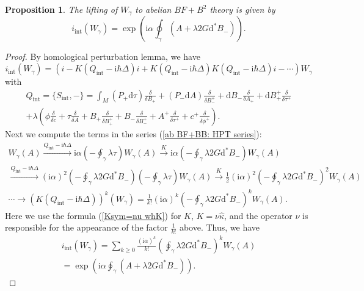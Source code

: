 \documentclass{amsart}
\theoremstyle{plain} %
\newtheorem{prop}[thm]{Proposition}
\theoremstyle{definition}
\theoremstyle{remark}
\newcommand{\ra}{\rightarrow}
\newcommand{\wh}{\widehat}
\newcommand{\xra}{\xrightarrow}
\newcommand{\ii}{\mathrm{int}}
\newcommand{\iii}{\mathrm{i}}
\newcommand{\dr}{\mathrm{d}}
\begin{document}
\begin{prop}\label{prop: lifting ab Wilson loop}
    The lifting of $W_\gamma$ to abelian $BF+B^2$ theory is given by
    \begin{equation}\label{ab BF+BB: i_int(W)}
        i_\ii(W_\gamma)=\exp \left(\iii\alpha \oint_\gamma (A+\lambda 2 G \dr^*B_-)\right).
    \end{equation}
\end{prop}
\begin{proof}
By homological perturbation lemma, we have
\begin{equation}\label{ab BF+BB: HPT series}
    i_\ii(W_\gamma)=(i-K(Q_\ii-\iii\hbar \Delta) i + K(Q_\ii-\iii\hbar \Delta)K(Q_\ii-\iii\hbar \Delta) i-\cdots) W_\gamma
\end{equation}
with 
\begin{multline}
    Q_\ii=\{S_\ii,-\}= \int_M (P_+ \dr\tau) \frac{\delta}{\delta B_+}+ (P_- \dr A) \frac{\delta}{\delta B_-^+}+\dr B_- \frac{\delta}{\delta A_+} + \dr B_+^+ \frac{\delta}{\delta \tau^+}\\
    +\lambda \left(
    \phi\frac{\delta}{\delta c}+\tau \frac{\delta}{\delta A}+B_+\frac{\delta}{\delta B_+^+}+B_-\frac{\delta}{\delta B_-^+}+A^+\frac{\delta}{\delta \tau^+}+c^+\frac{\delta}{\delta \phi^+}
    \right).
\end{multline}
Next we compute the terms in the series (\ref{ab BF+BB: HPT series}):
\begin{multline}
    W_\gamma(A) \xra{Q_\ii-\iii\hbar\Delta} \iii\alpha\left(-\oint_\gamma \lambda \tau\right)W_\gamma(A) \xra{K} \iii\alpha\left(-\oint_\gamma \lambda 2G\dr^* B_-\right)W_\gamma(A) \\
    \xra{Q_\ii-\iii\hbar\Delta} (\iii\alpha)^2\left(-\oint_\gamma \lambda 2G\dr^* B_-\right)\left(-\oint_\gamma \lambda \tau\right)W_\gamma(A) 
    \xra{K} 
    \frac12  (\iii\alpha)^2\left(-\oint_\gamma \lambda 2G\dr^* B_-\right)^2 W_\gamma(A)\\
    \cdots \ra (K(Q_\ii-\iii\hbar\Delta))^k (W_\gamma)=
    \frac{1}{k!}(\iii\alpha)^k \left(-\oint_\gamma \lambda 2G\dr^* B_-\right)^k W_\gamma(A).
\end{multline}
Here we use the formula (\ref{Ksym=nu whK}) for $K$, $K=\nu\wh\kappa$, and the operator $\nu$ is responsible for the appearance of the factor $\frac{1}{k!}$ above. Thus, we have
\begin{multline}
    i_\ii(W_\gamma)= \sum_{k\geq 0}\frac{(\iii\alpha)^k}{k!} \left(\oint_\gamma \lambda 2G\dr^* B_-\right)^k W_\gamma(A)\\
    =\exp \left(\iii\alpha \oint_\gamma (A+\lambda 2 G \dr^*B_-)\right).
\end{multline}
\end{proof}
\end{document}
